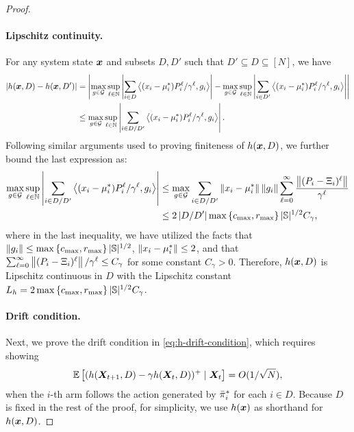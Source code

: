 \begin{proof}
\paragraph{Lipschitz continuity.}
For any system state $\bm{x}$ and subsets $D,D'$ such that $D'\subseteq D \subseteq [N]$, we have
\begin{align}
    \nonumber
    \left\lvert h(\bm{x},D)-h(\bm{x},D')\right\rvert
    &=  \left\lvert\max_{g\in \mathcal{G}}  \sup_{\ell\in\mathbb{N}} 
 \left\lvert\sum_{i\in D} \left\langle (x_i-\mu_i^*) P_i^{\ell} / \gamma^{\ell}, g_i \right\rangle\right\rvert -  
    \max_{g\in \mathcal{G}}  \sup_{\ell\in\mathbb{N}} \left\lvert\sum_{i\in D'} \left\langle (x_i-\mu_i^*) P_i^{\ell} / \gamma^{\ell}, g_i \right\rangle\right\rvert\right\rvert \\
    \label{eq:pf-subset-lyapunov:lipschitz-1}
    &\leq \max_{g\in \mathcal{G}} \sup_{\ell\in\mathbb{N}} \left\lvert\sum_{i\in D/D'}\left\langle (x_i-\mu_i^*)P_i^{\ell}/\gamma^{\ell}, g_i \right\rangle\right\rvert. 
\end{align}
Following similar arguments used to proving finiteness of $h(\bm{x}, D)$, we further bound the last expression as: 
\begin{align}
    \nonumber
    \max_{g\in \mathcal{G}} \sup_{\ell\in\mathbb{N}} \left\lvert\sum_{i\in D/D'}\left\langle (x_i-\mu_i^*)P_i^{\ell}/\gamma^{\ell}, g_i \right\rangle\right\rvert 
    &\leq  \max_{g\in \mathcal{G}}  \sum_{i\in D/D'} \left\lVert x_i-\mu_i^*\right\rVert \left\lVert g_i\right\rVert \sum_{\ell=0}^\infty \frac{\left\lVert(P_i-\Xi_i)^{\ell}\right\rVert}{\gamma^{\ell}}\\
    \label{eq:pf-subset-lyapunov:lipschitz-2}
    &\leq 2\left\lvert D/D'\right\rvert \max\left\{ c_{\max},r_{\max} \right\}\lvert\mathbb{S}\rvert^{1/2}C_{\gamma},
\end{align}
where in the last inequality, we have utilized the facts that $\left\lVert g_i\right\rVert \leq \max\left\{ c_{\max},r_{\max} \right\} \lvert\mathbb{S}\rvert^{1/2}$,  $\left\lVert x_i - \mu_i^*\right\rVert \leq 2$, and that  $\sum_{\ell=0}^\infty \left\lVert(P_i-\Xi_i)^{\ell}\right\rVert / \gamma^{\ell} \leq C_{\gamma}$ for some constant $C_\gamma > 0$. 
Therefore, $h(\bm{x}, D)$ is Lipschitz continuous in $D$ with the Lipschitz constant 
$L_h = 2\max\left\{ c_{\max},r_{\max} \right\}\lvert\mathbb{S}\rvert^{1/2}C_{\gamma}$. 


\paragraph{Drift condition.}
Next, we prove the drift condition in \eqref{eq:h-drift-condition}, which requires showing 
\[
    \mathbb{E}\left[(h({\bm{X}}_{t+1}, D) - \gamma h({\bm{X}}_t, D))^+ \;|\; {\bm{X}}_t\right] = O(1/\sqrt{N}),
\]
when the $i$-th arm follows the action generated by ${{\bar{\pi}}^*}_i$ for each $i\in D$. 
Because $D$ is fixed in the rest of the proof, for simplicity, we use $h(\bm{x})$ as shorthand for $h(\bm{x}, D)$. 


\end{proof}

